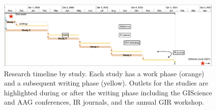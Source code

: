 \begin{figure}[H]
    \centering
    \includegraphics[width=1\textwidth]{../figures/Timeline.png}
    \caption{Research timeline by study. Each study has a work phase (orange) and a subsequent writing phase (yellow). Outlets for the studies are highlighted during or after the writing phase including the GIScience and AAG conferences, IR journals, and the annual GIR workshop.}
    \label{fig:Timeline}
\end{figure}